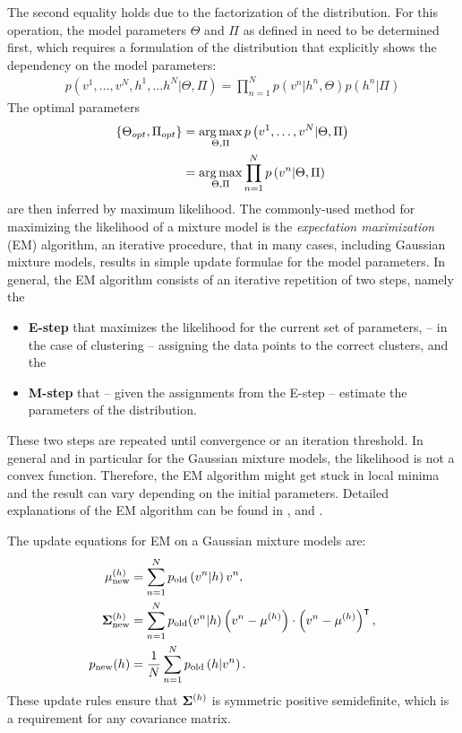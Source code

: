 The second equality holds due to the factorization of the distribution.  For this operation, the
model parameters $\Theta$ and $\Pi$ as defined in  need to be determined first, which
requires a formulation of the distribution that explicitly shows the dependency on the model
parameters:
\begin{align}
    \label{eq:gmm-distr-param}
    p(v^1,\dots ,v^N,h^1,\dots h^N|\Theta ,\Pi ) = \prod_{n=1}^Np(v^n|h^n, \Theta )p(h^n|\Pi )
\end{align}
The optimal parameters
\begin{align}
    \label{eq:gmm-ml}
    \left\{\Theta_{opt} ,\Pi_{opt}\right\} &= \operatorname*{arg\,max}_{\Theta ,\Pi } p\left(v^1,\hdots ,v^N|\Theta
        ,\Pi\right) \\
    &= \operatorname*{arg\,max}_{\Theta ,\Pi } \prod_{n=1}^Np\left(v^n|\Theta ,\Pi\right)
\end{align}
are then inferred by maximum likelihood. The commonly-used method for maximizing the likelihood of a
mixture model is the \emph{expectation maximization} (EM) algorithm, an iterative procedure, that in
many cases, including Gaussian mixture models, results in simple update formulae for the model
parameters. In general, the EM algorithm consists of an iterative repetition of two steps, namely the
\begin{itemize}
      \item \textbf{E-step} that maximizes the likelihood for the current set of parameters, \ie -- in
    the case of clustering -- assigning the data points to the correct clusters, and the
      \item \textbf{M-step} that -- given the assignments from the E-step -- estimate the parameters
    of the distribution.
\end{itemize}
These two steps are repeated until convergence or an iteration threshold. In general and in
particular for the Gaussian mixture models, the likelihood
is not a convex function. Therefore, the EM algorithm might get stuck in local minima and the result
can vary depending on the initial parameters. Detailed explanations of the EM algorithm can be
found in \citep[Chapter~11.2]{barber_12_bayesian},
\citet[Chapter~3]{mclachlan_97_em} and \citet{borman_04_expectation}.

The update equations for EM on a Gaussian mixture models are:
\begin{align}
    \label{eq:gmm-update-eq}
    \mathbf{\mu }^{(h)}_{\text{new}} &= \sum_{n=1}^Np_{\text{old}}\left(v^n|h\right)v^n, \\
    \mathbf{\Sigma }^{(h)}_{\text{new}} &=
    \sum_{n=1}^Np_{\text{old}}(v^n|h)\left(v^n-\mathbf{\mu }^{(h)}\right)\cdot\left(v^n-\mathbf{\mu }^{(h)}\right)^\intercal, \\
    p_{\text{new}}(h) &= \frac{1}{N}\sum_{n=1}^N p_{\text{old}}\left(h|v^n\right).
\end{align}
These update rules ensure that $\mathbf{\Sigma }^{(h)}$ is symmetric positive semidefinite, which is a requirement
for any covariance matrix.



